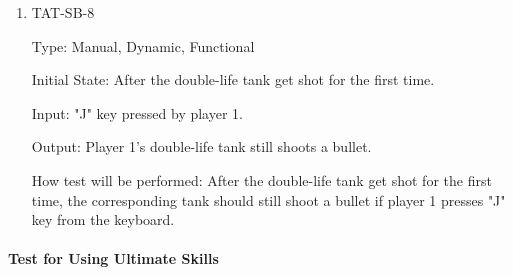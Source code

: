 \documentclass[12pt, titlepage]{article}
\begin{document}
\begin{enumerate}
\item{TAT-SB-8\\}

Type: Manual, Dynamic, Functional
					
Initial State: After the double-life tank get shot for the first time.
					
Input: "J" key pressed by player 1.
					
Output: Player 1's double-life tank still shoots a bullet.
					
How test will be performed: After the double-life tank get shot for the first time, the corresponding tank should still shoot a bullet if player 1 presses "J" key from the keyboard.

\end{enumerate}

\paragraph{Test for Using Ultimate Skills}
\end{document}
